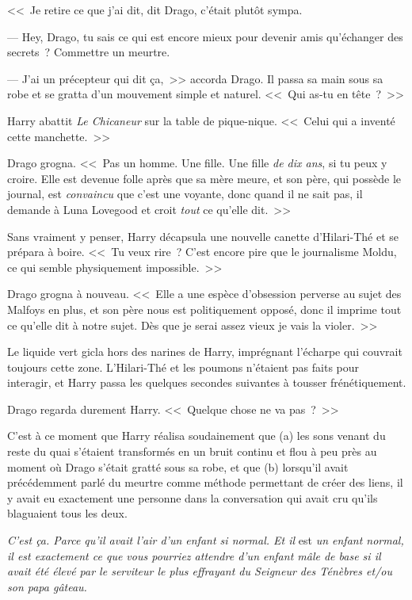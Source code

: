 <<~Je retire ce que j'ai dit, dit Drago, c'était plutôt sympa.

--- Hey, Drago, tu sais ce qui est encore mieux pour devenir amis qu'échanger des secrets~? Commettre un meurtre.

--- J'ai un précepteur qui dit ça,~>> accorda Drago. Il passa sa main sous sa robe et se gratta d'un mouvement simple et naturel. <<~Qui as-tu en tête~?~>>

Harry abattit \emph{Le Chicaneur} sur la table de pique-nique. <<~Celui qui a inventé cette manchette.~>>

Drago grogna. <<~Pas un homme. Une fille. Une fille \emph{de dix ans}, si tu peux y croire. Elle est devenue folle après que sa mère meure, et son père, qui possède le journal, est \emph{convaincu} que c'est une voyante, donc quand il ne sait pas, il demande à Luna Lovegood et croit \emph{tout} ce qu'elle dit.~>>

Sans vraiment y penser, Harry décapsula une nouvelle canette d'Hilari-Thé et se prépara à boire. <<~Tu veux rire~? C'est encore pire que le journalisme Moldu, ce qui semble physiquement impossible.~>>

Drago grogna à nouveau. <<~Elle a une espèce d'obsession perverse au sujet des Malfoys en plus, et son père nous est politiquement opposé, donc il imprime tout ce qu'elle dit à notre sujet. Dès que je serai assez vieux je vais la violer.~>>

Le liquide vert gicla hors des narines de Harry, imprégnant l'écharpe qui couvrait toujours cette zone. L'Hilari-Thé et les poumons n'étaient pas faits pour interagir, et Harry passa les quelques secondes suivantes à tousser frénétiquement.

Drago regarda durement Harry. <<~Quelque chose ne va pas~?~>>

C'est à ce moment que Harry réalisa soudainement que (a) les sons venant du reste du quai s'étaient transformés en un bruit continu et flou à peu près au moment où Drago s'était gratté sous sa robe, et que (b) lorsqu'il avait précédemment parlé du meurtre comme méthode permettant de créer des liens, il y avait eu exactement une personne dans la conversation qui avait cru qu'ils blaguaient tous les deux.

\emph{C'est ça. Parce qu'il avait l'air d'un enfant si normal. Et il} est \emph{un enfant normal, il est exactement ce que vous pourriez attendre d'un enfant mâle de base si il avait été élevé par le serviteur le plus effrayant du Seigneur des Ténèbres et/ou son papa gâteau.}

